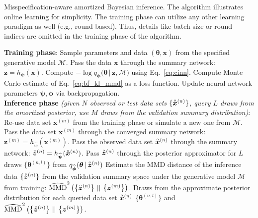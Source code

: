 \documentclass[twoside,11pt]{article}
\newcommand{\observed}[1]{\protect\accentset{\text{o}}{#1}}%
\newcommand{\x}{\boldsymbol{x}}
\newcommand{\z}{\boldsymbol{z}}
\newcommand{\thetab}{\boldsymbol{\theta}}
\newcommand{\phib}{\boldsymbol{\phi}}
\newcommand{\psib}{\boldsymbol{\psi}}
\newcommand{\0}{\boldsymbol{0}}
\newcommand{\given}{\,|\,}
\newcommand{\M}{\mathcal{M}}
\begin{document}
\begin{algorithm}[t]
\caption{Misspecification-aware amortized Bayesian inference. The algorithm illustrates online learning for simplicity. The training phase can utilize any other learning paradigm as well (e.g., round-based). Thus, details like batch size or round indices are omitted in the training phase of the algorithm.}
\label{alg:mms}
\begin{algorithmic}[1]
\State \textbf{Training phase}:
\Repeat
\State Sample parameters and data $(\thetab, \x)$ from the specified generative model $\M$.
\State Pass the data $\x$ through the summary network: $\z = h_{\psib}(\x)$.
\State Compute $-\log q_{\phib}\big(\thetab\given \z, \mathcal{M}\big)$ using Eq.~\ref{eq:cinn}.
\State Compute Monte Carlo estimate of Eq.~\ref{eq:bf_kl_mmd} as a loss function.
\State Update neural network parameters $\psib, \phib$  via backpropagation.
\Until{convergence to $\widehat{\psib}, \widehat{\phib}$}
\\
\State \textbf{Inference phase} \textit{(given $N$ observed or test data sets $\{\observed{\x}^{(n)}\}$, query $L$ draws from the amortized posterior, use $M$ draws from the validation summary distribution)}:
\State Re-use data set $\x^{(m)}$ from the training phase or simulate a new one from $\mathcal{M}$.
\State Pass the data set $\x^{(m)}$ through the converged summary network: $\z^{(m)} = h_{\widehat{\psib}}(\x^{(m)})$.
\EndFor
{}
\State Pass the observed data set $\observed{\x}^{(n)}$ through the summary network: $\observed{\z}^{(n)} = h_{\widehat{\psib}}(\observed{\x}^{(n)})$.
\State Pass $\observed{\z}^{(n)}$ through the posterior approximator for $L$ draws $\{\thetab^{(n, l)}\}$ from $q_{\widehat{\phib}}(\thetab \given \observed{\z}^{(n)})$
\EndFor
\State Estimate the MMD distance of the inference data $\{\observed{\z}^{(n)}\}$ from the validation summary space under the generative model $\M$ from training: $\widehat{\mathrm{MMD}}^2\left(\left\{\observed{\z}^{(n)} \right\} \,||\,\left\{\z^{(m)} \right\}\right)$.
\State \Return Draws from the approximate posterior distribution for each queried data set $\observed{\x}^{(n)}$ $\{\thetab^{(n, l)}\}$ and $\widehat{\mathrm{MMD}}^2\left(\left\{\observed{\z}^{(n)} \right\} \,||\,\left\{\z^{(m)} \right\}\right)$.
\end{algorithmic}
\end{algorithm}
\end{document}
